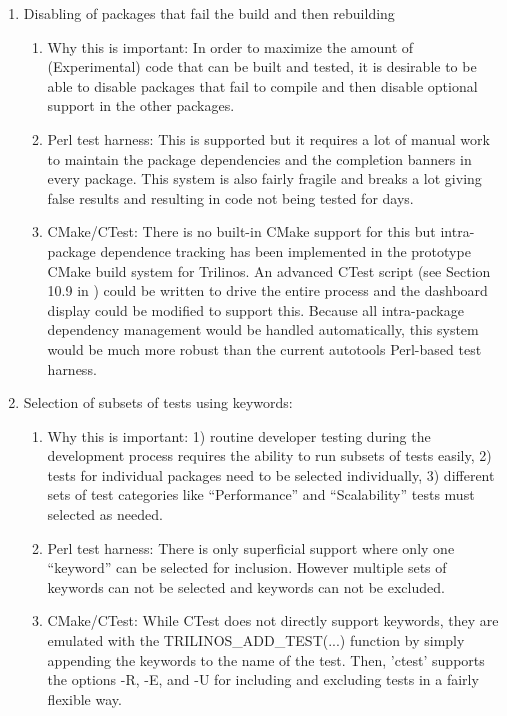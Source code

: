 \documentclass[pdf,ps2pdf,11pt]{SANDreport}
\begin{document}
\begin{enumerate}
{}\item Disabling of packages that fail the build and then rebuilding

  \begin{enumerate}

  {}\item Why this is important: In order to maximize the amount of
  (Experimental) code that can be built and tested, it is desirable
  to be able to disable packages that fail to compile and then
  disable optional support in the other packages.

  {}\item Perl test harness: This is supported but it requires a lot
  of manual work to maintain the package dependencies and the
  completion banners in every package.  This system is also fairly
  fragile and breaks a lot giving false results and resulting in code
  not being tested for days.

  {}\item CMake/CTest: There is no built-in CMake support for this but
  intra-package dependence tracking has been implemented in the
  prototype CMake build system for Trilinos.  An advanced CTest script
  (see Section 10.9 in {}\cite{MasteringCMake_fourth}) could be
  written to drive the entire process and the dashboard display could
  be modified to support this.  Because all intra-package dependency
  management would be handled automatically, this system would be much
  more robust than the current autotools Perl-based test harness.

  \end{enumerate}

{}\item Selection of subsets of tests using keywords:

  \begin{enumerate}

  {}\item Why this is important: 1) routine developer testing during
  the development process requires the ability to run subsets of tests
  easily, 2) tests for individual packages need to be selected
  individually, 3) different sets of test categories like
  ``Performance'' and ``Scalability'' tests must selected as needed.

  {}\item Perl test harness: There is only superficial support where
  only one ``keyword'' can be selected for inclusion.  However
  multiple sets of keywords can not be selected and keywords can not
  be excluded.

  {}\item CMake/CTest: While CTest does not directly support keywords,
  they are emulated with the TRILINOS\_ADD\_TEST(...) function by
  simply appending the keywords to the name of the test.  Then,
  'ctest' supports the options -R, -E, and -U for including and
  excluding tests in a fairly flexible way.

  \end{enumerate}

\end{enumerate}
\end{document}
